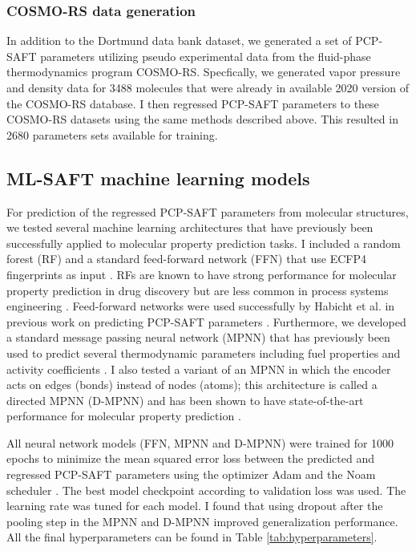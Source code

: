 \subsubsection{COSMO-RS data generation}

In addition to the Dortmund data bank dataset, we generated a set of PCP-SAFT parameters utilizing pseudo experimental data from the fluid-phase thermodynamics program COSMO-RS.\cite{Klamt2010} Specfically, we generated vapor pressure and density data for 3488 molecules that were already in available 2020 version of the COSMO-RS database. I then regressed PCP-SAFT parameters to these COSMO-RS datasets using the same methods described above. This resulted in 2680 parameters sets available for training.

\subsection{ML-SAFT machine learning models}\label{subsec:ML-SAFT_model}

For prediction of the regressed PCP-SAFT parameters from molecular structures, we tested several machine learning architectures that have previously been successfully applied to molecular property prediction tasks. I included a random forest (RF)\cite{Breiman2001} and a standard feed-forward network (FFN) that use ECFP4 fingerprints as input \cite{Rogers2010}. RFs are known to have strong performance for molecular property prediction in drug discovery but are less common in process systems engineering \cite{Ramsundar2017, Yang2019}. Feed-forward networks were used successfully by Habicht et al. in previous work on predicting PCP-SAFT parameters \cite{Habicht2023}. Furthermore, we developed a standard message passing neural network (MPNN) \cite{Gilmer2017} that has previously been used to predict several thermodynamic parameters including fuel properties\cite{Schweidtmann2020} and activity coefficients \cite{SanchezMedina2022, Rittig2023}. I also tested a variant of an MPNN in which the encoder acts on edges (bonds) instead of nodes (atoms); this architecture is called a directed MPNN (D-MPNN) and has been shown to have state-of-the-art performance for molecular property prediction \cite{Yang2019, Vermeire2021}.

All neural network models (FFN, MPNN and D-MPNN) were trained for 1000 epochs to minimize the mean squared error loss between the predicted and regressed PCP-SAFT parameters using the optimizer Adam\cite{Kingma2015} and the Noam scheduler \cite{Vaswani2017}. The best model checkpoint according to validation loss was used. The learning rate was tuned for each model. I found that using dropout after the pooling step in the MPNN and D-MPNN improved generalization performance. All the final hyperparameters can be found in Table \ref{tab:hyperparameters}.

